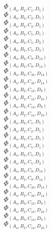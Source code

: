 \documentclass[14pt]{article}
\begin{document}
    $\Phi_{({A}_{4}, {B}_{2}, {C}_{1}, {D}_{5})}$ \\ 
    $\Phi_{({A}_{4}, {B}_{2}, {C}_{2}, {D}_{5})}$ \\ 
    $\Phi_{({A}_{4}, {B}_{2}, {C}_{3}, {D}_{5})}$ \\ 
    $\Phi_{({A}_{4}, {B}_{2}, {C}_{5}, {D}_{1})}$ \\ 
    $\Phi_{({A}_{4}, {B}_{2}, {C}_{5}, {D}_{2})}$ \\ 
    $\Phi_{({A}_{4}, {B}_{2}, {C}_{5}, {D}_{3})}$ \\ 
    $\Phi_{({A}_{4}, {B}_{2}, {C}_{9}, {D}_{13})}$ \\ 
    $\Phi_{({A}_{4}, {B}_{2}, {C}_{9}, {D}_{14})}$ \\ 
    $\Phi_{({A}_{4}, {B}_{2}, {C}_{10}, {D}_{13})}$ \\ 
    $\Phi_{({A}_{4}, {B}_{2}, {C}_{10}, {D}_{14})}$ \\ 
    $\Phi_{({A}_{4}, {B}_{2}, {C}_{13}, {D}_{9})}$ \\ 
    $\Phi_{({A}_{4}, {B}_{2}, {C}_{13}, {D}_{10})}$ \\ 
    $\Phi_{({A}_{4}, {B}_{2}, {C}_{14}, {D}_{9})}$ \\ 
    $\Phi_{({A}_{4}, {B}_{2}, {C}_{14}, {D}_{10})}$ \\ 
    $\Phi_{({A}_{4}, {B}_{3}, {C}_{1}, {D}_{5})}$ \\ 
    $\Phi_{({A}_{4}, {B}_{3}, {C}_{2}, {D}_{5})}$ \\ 
    $\Phi_{({A}_{4}, {B}_{3}, {C}_{3}, {D}_{5})}$ \\ 
    $\Phi_{({A}_{4}, {B}_{3}, {C}_{5}, {D}_{1})}$ \\ 
    $\Phi_{({A}_{4}, {B}_{3}, {C}_{5}, {D}_{2})}$ \\ 
    $\Phi_{({A}_{4}, {B}_{3}, {C}_{5}, {D}_{3})}$ \\ 
    $\Phi_{({A}_{4}, {B}_{3}, {C}_{9}, {D}_{13})}$ \\ 
    $\Phi_{({A}_{4}, {B}_{3}, {C}_{9}, {D}_{14})}$ \\ 
    $\Phi_{({A}_{4}, {B}_{3}, {C}_{10}, {D}_{13})}$ \\ 
    $\Phi_{({A}_{4}, {B}_{3}, {C}_{10}, {D}_{14})}$ \\ 
    $\Phi_{({A}_{4}, {B}_{3}, {C}_{13}, {D}_{9})}$ \\ 
    $\Phi_{({A}_{4}, {B}_{3}, {C}_{13}, {D}_{10})}$ \\ 
    $\Phi_{({A}_{4}, {B}_{3}, {C}_{14}, {D}_{9})}$ \\ 
    $\Phi_{({A}_{4}, {B}_{3}, {C}_{14}, {D}_{10})}$ \\ 
\end{document}
